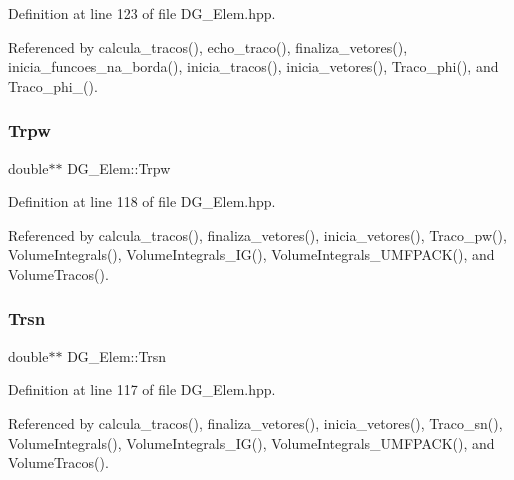Definition at line 123 of file D\+G\+\_\+\+Elem.\+hpp.



Referenced by calcula\+\_\+tracos(), echo\+\_\+traco(), finaliza\+\_\+vetores(), inicia\+\_\+funcoes\+\_\+na\+\_\+borda(), inicia\+\_\+tracos(), inicia\+\_\+vetores(), Traco\+\_\+phi(), and Traco\+\_\+phi\+\_().

\mbox{\label{classDG__Elem_a77316e95196e96ce7b612334075c8307}} 
\subsubsection{\texorpdfstring{Trpw}{Trpw}}
{\footnotesize\ttfamily double$\ast$$\ast$ D\+G\+\_\+\+Elem\+::\+Trpw\hspace{0.3cm}{\ttfamily [private]}}



Definition at line 118 of file D\+G\+\_\+\+Elem.\+hpp.



Referenced by calcula\+\_\+tracos(), finaliza\+\_\+vetores(), inicia\+\_\+vetores(), Traco\+\_\+pw(), Volume\+Integrals(), Volume\+Integrals\+\_\+\+I\+G(), Volume\+Integrals\+\_\+\+U\+M\+F\+P\+A\+C\+K(), and Volume\+Tracos().

\mbox{\label{classDG__Elem_a57d06772c710267516e58be078a6635b}} 
\subsubsection{\texorpdfstring{Trsn}{Trsn}}
{\footnotesize\ttfamily double$\ast$$\ast$ D\+G\+\_\+\+Elem\+::\+Trsn\hspace{0.3cm}{\ttfamily [private]}}



Definition at line 117 of file D\+G\+\_\+\+Elem.\+hpp.



Referenced by calcula\+\_\+tracos(), finaliza\+\_\+vetores(), inicia\+\_\+vetores(), Traco\+\_\+sn(), Volume\+Integrals(), Volume\+Integrals\+\_\+\+I\+G(), Volume\+Integrals\+\_\+\+U\+M\+F\+P\+A\+C\+K(), and Volume\+Tracos().

\mbox{\label{classPhElem_a1ed1b45136a718afef64c846fb905546}} 
